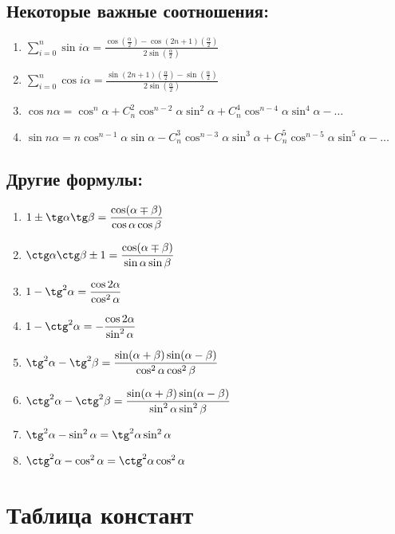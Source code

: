 \documentclass[12pt, a4paper]{article}
\begin{document}
\subsection{Некоторые важные соотношения:}
\begin{enumerate}
	\item $\displaystyle \sum\limits_{i=0}^{n} \sin i\alpha = \displaystyle  \frac{\cos\left(\displaystyle \frac{\alpha}{2}\right)-\cos(2n+1)\left(\displaystyle \frac{\alpha}{2}\right)}{2\sin\left(\displaystyle \frac{\alpha}{2}\right)}$ 
	\item $\displaystyle \sum\limits_{i=0}^{n} \cos i\alpha = \displaystyle  \frac{\sin(2n+1)\left(\displaystyle \frac{\alpha}{2}\right)-\sin\left(\displaystyle \frac{\alpha}{2}\right)}{2\sin\left(\displaystyle \frac{\alpha}{2}\right)}$ 
	\item $\cos n\alpha = \cos^n \alpha + C^2_n\cos^{n-2}\alpha\sin^2\alpha + C^4_n\cos^{n-4}\alpha\sin^4\alpha - \ldots$
	\item $\sin n\alpha = n\cos^{n-1} \alpha \sin \alpha - C^3_n\cos^{n-3}\alpha\sin^3\alpha + C^5_n\cos^{n-5}\alpha\sin^5\alpha - \ldots$
\end{enumerate}
\subsection{Другие формулы:}
\begin{enumerate}
	\item $\displaystyle 1 \pm \tg\alpha \tg\beta = \frac{\cos(\alpha\mp\beta)}{\cos\alpha\cos\beta}$
	\item $\displaystyle \ctg\alpha \ctg\beta \pm 1 = \frac{\cos(\alpha\mp\beta)}{\sin\alpha\sin\beta}$
	\item $\displaystyle 1-\tg^2\alpha = \frac{\cos 2\alpha}{\cos^2\alpha}$
	\item $\displaystyle 1-\ctg^2\alpha = -\frac{\cos 2\alpha}{\sin^2\alpha}$
	\item $\displaystyle \tg^2\alpha - \tg^2\beta  = \frac{\sin(\alpha+\beta)\sin(\alpha-\beta)}{\cos^2\alpha\cos^2\beta}$
	\item $\displaystyle \ctg^2\alpha - \ctg^2\beta  = \frac{\sin(\alpha+\beta)\sin(\alpha-\beta)}{\sin^2\alpha\sin^2\beta}$
	\item $\tg^2\alpha - \sin^2\alpha = \tg^2\alpha \sin^2\alpha $
	\item $\ctg^2\alpha - \cos^2\alpha = \ctg^2\alpha \cos^2\alpha $
\end{enumerate} 

\newpage
\section{Таблица констант}
\end{document}
